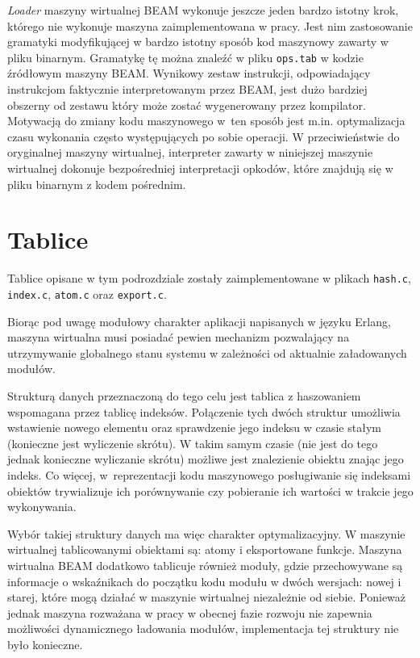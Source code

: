\emph{Loader} maszyny wirtualnej BEAM wykonuje jeszcze jeden bardzo istotny krok, którego nie wykonuje maszyna zaimplementowana w pracy. Jest nim zastosowanie gramatyki modyfikującej w bardzo istotny sposób kod maszynowy zawarty w pliku binarnym. Gramatykę tę można znaleźć w pliku \texttt{ops.tab} w kodzie źródłowym maszyny BEAM. Wynikowy zestaw instrukcji, odpowiadający instrukcjom faktycznie interpretowanym przez BEAM, jest dużo bardziej obszerny od zestawu który może zostać wygenerowany przez kompilator. Motywacją do zmiany kodu maszynowego w~ten sposób jest m.in. optymalizacja czasu wykonania często występujących po sobie operacji. W przeciwieństwie do oryginalnej maszyny wirtualnej, interpreter zawarty w niniejszej maszynie wirtualnej dokonuje bezpośredniej interpretacji opkodów, które znajdują się w pliku binarnym z kodem pośrednim.

\section{Tablice}
\label{sec:maszynaTablice}

Tablice opisane w tym podrozdziale zostały zaimplementowane w plikach \texttt{hash.c}, \texttt{index.c}, \texttt{atom.c} oraz \texttt{export.c}.

Biorąc pod uwagę modułowy charakter aplikacji napisanych w języku Erlang, maszyna wirtualna musi posiadać pewien mechanizm pozwalający na utrzymywanie globalnego stanu systemu w zależności od aktualnie załadowanych modułów.

Strukturą danych przeznaczoną do tego celu jest tablica z haszowaniem wspomagana przez tablicę indeksów. Połączenie tych dwóch struktur umożliwia wstawienie nowego elementu oraz sprawdzenie jego indeksu w czasie stałym (konieczne jest wyliczenie skrótu). W takim samym czasie (nie jest do tego jednak konieczne wyliczanie skrótu) możliwe jest znalezienie obiektu znając jego indeks. Co więcej, w~reprezentacji kodu maszynowego posługiwanie się indeksami obiektów trywializuje ich porównywanie czy pobieranie ich wartości w trakcie jego wykonywania.

Wybór takiej struktury danych ma więc charakter optymalizacyjny. W maszynie wirtualnej tablicowanymi obiektami są: atomy i eksportowane funkcje. Maszyna wirtualna BEAM dodatkowo tablicuje również moduły, gdzie przechowywane są informacje o wskaźnikach do początku kodu modułu w dwóch wersjach: nowej i starej, które mogą działać w maszynie wirtualnej niezależnie od siebie. Ponieważ jednak maszyna rozważana w pracy w obecnej fazie rozwoju nie zapewnia możliwości dynamicznego ładowania modułów, implementacja tej struktury nie było konieczne.

